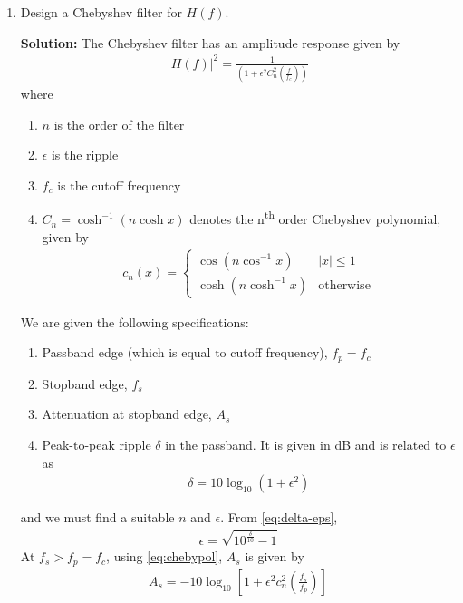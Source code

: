 \documentclass[journal,12pt,twocolumn]{IEEEtran}
\newcommand{\solution}{\noindent \textbf{Solution: }}
\providecommand{\brak}[1]{\ensuremath{\left(#1\right)}}
\providecommand{\sbrak}[1]{\ensuremath{\left[#1\right]}}
\providecommand{\abs}[1]{\left\vert#1\right\vert}
\numberwithin{equation}{section}
\numberwithin{figure}{section}
\renewcommand\thesection{\arabic{section}}
\begin{document}
\begin{enumerate}[label=\thesection.\arabic*
,ref=\thesection.\theenumi]
\item Design a Chebyshev filter for $H(f)$.

\solution The Chebyshev filter has an amplitude response
given by
\begin{align}
    \abs{H\brak{f}}^2 = \frac{1}{\brak{1 + \epsilon^2C_n^2\brak{\frac{f}{f_c}}}}
\end{align}
where 
\begin{enumerate}
    \item $n$ is the order of the filter
    \item $\epsilon$ is the ripple
    \item $f_c$ is the cutoff frequency 
    \item $C_n = \cosh^{-1}\brak{n\cosh{x}}$ denotes 
    the n\textsuperscript{th} order Chebyshev polynomial,
    given by
    \begin{align}
        c_n(x) =
        \begin{cases}
            \cos\brak{n\cos^{-1}x} & \abs{x} \le 1 \\
            \cosh\brak{n\cosh^{-1}x} & \textrm{otherwise}
        \end{cases}
        \label{eq:chebypol}
    \end{align}
\end{enumerate}
We are given the following specifications:
\begin{enumerate}
    \item Passband edge (which is equal to 
    cutoff frequency), $f_p = f_c$
    \item Stopband edge, $f_s$
    \item Attenuation at stopband edge, $A_s$
    \item Peak-to-peak ripple $\delta$ in the passband.
    It is given in dB and is related to $\epsilon$ as
    \begin{align}
        \delta = 10\log_{10}\brak{1 + \epsilon^2}
        \label{eq:delta-eps}
    \end{align}
\end{enumerate}
and we must find a suitable $n$ and $\epsilon$. From
\eqref{eq:delta-eps},
\begin{align}
    \epsilon = \sqrt{10^{\frac{\delta}{10}} - 1}
    \label{eq:epsilon-del}
\end{align}
At $f_s > f_p = f_c$, using \eqref{eq:chebypol}, $A_s$ is given by
\begin{align}
    A_s = -10\log_{10}\sbrak{1 + \epsilon^2c_n^2\brak{\frac{f_s}{f_p}}} \\

\end{align}
\end{enumerate}
\end{document}
